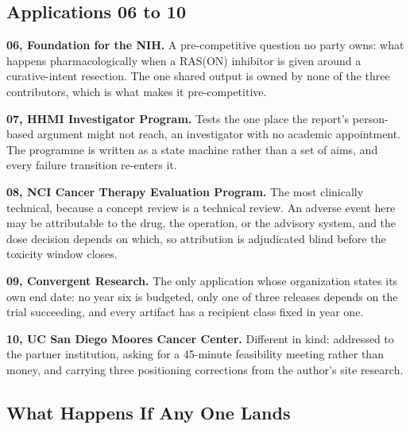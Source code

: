 \subsection{Applications 06 to 10}

\textbf{06, Foundation for the NIH.} A pre-competitive question no party owns:
what happens pharmacologically when a RAS(ON) inhibitor is given around a
curative-intent resection. The one shared output is owned by none of the three
contributors, which is what makes it pre-competitive.

\textbf{07, HHMI Investigator Program.} Tests the one place the report's
person-based argument might not reach, an investigator with no academic
appointment. The programme is written as a state machine rather than a set of
aims, and every failure transition re-enters it.

\textbf{08, NCI Cancer Therapy Evaluation Program.} The most clinically
technical, because a concept review is a technical review. An adverse event here
may be attributable to the drug, the operation, or the advisory system, and the
dose decision depends on which, so attribution is adjudicated blind before the
toxicity window closes.

\textbf{09, Convergent Research.} The only application whose organization states
its own end date: no year six is budgeted, only one of three releases depends on
the trial succeeding, and every artifact has a recipient class fixed in year one.

\textbf{10, UC San Diego Moores Cancer Center.} Different in kind: addressed to
the partner institution, asking for a 45-minute feasibility meeting rather than
money, and carrying three positioning corrections from the author's site
research.

\subsection{What Happens If Any One Lands}

